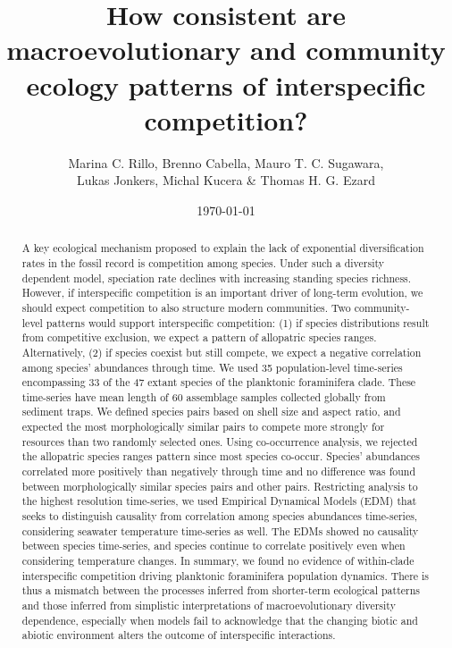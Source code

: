 \documentclass[a4paper]{article}
\title{How consistent are macroevolutionary and community ecology patterns of interspecific competition?}
\author{Marina C. Rillo, Brenno Cabella, Mauro T. C. Sugawara, \\ Lukas Jonkers, Michal Kucera \& Thomas H. G. Ezard}
\date{\today}
\begin{document}
\maketitle

\begin{abstract}

A key ecological mechanism proposed to explain the lack of exponential diversification rates in the fossil record is competition among species. Under such a diversity dependent model, speciation rate declines with increasing standing species richness. However, if interspecific competition is an important driver of long-term evolution, we should expect competition to also structure modern communities. Two community-level patterns would support interspecific competition: (1) if species distributions result from competitive exclusion, we expect a pattern of allopatric species ranges. Alternatively, (2) if species coexist but still compete, we expect a negative correlation among species’ abundances through time. We used 35 population-level time-series encompassing 33 of the 47 extant species of the planktonic foraminifera clade. These time-series have mean length of 60 assemblage samples collected globally from sediment traps. We defined species pairs based on shell size and aspect ratio, and expected the most morphologically similar pairs to compete more strongly for resources than two randomly selected ones. Using co-occurrence analysis, we rejected the allopatric species ranges pattern since most species co-occur. Species’ abundances correlated more positively than negatively through time and no difference was found between morphologically similar species pairs and other pairs. Restricting analysis to the highest resolution time-series, we used Empirical Dynamical Models (EDM) that seeks to distinguish causality from correlation among species abundances time-series, considering seawater temperature time-series as well. The EDMs showed no causality between species time-series, and species continue to correlate positively even when considering temperature changes. In summary, we found no evidence of within-clade interspecific competition driving planktonic foraminifera population dynamics.  There is thus a mismatch between the processes inferred from shorter-term ecological patterns and those inferred from simplistic interpretations of macroevolutionary diversity dependence, especially when models fail to acknowledge that the changing biotic and abiotic environment alters the outcome of interspecific interactions.

\end{abstract}
\end{document}
